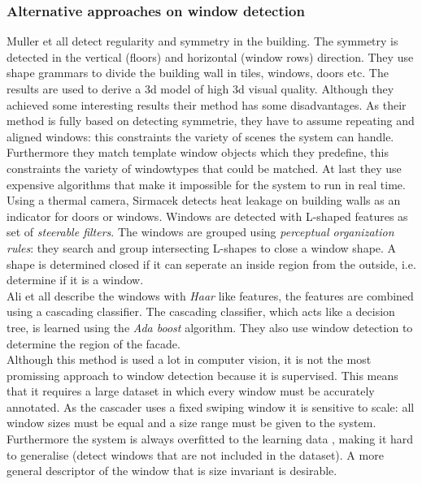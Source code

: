 \subsubsection{Alternative approaches on window detection}
Muller et all \cite{Muller_procedural} detect regularity and symmetry in the building. The
symmetry is detected in the vertical (floors) and horizontal (window
rows) direction.
They use shape grammars to divide the building wall in tiles, windows, doors etc.
The results are used to derive a 3d model of high 3d visual quality.
Although they achieved some interesting results their method has some
disadvantages.  As their method is fully based on detecting symmetrie, they have
to assume repeating and aligned windows: this constraints the variety of scenes
the system can handle.
Furthermore they match template window objects which they predefine, this 
constraints the variety of windowtypes that could be matched.  At last 
they use expensive algorithms that make it impossible for the system
to run in real time.  \\

Using a thermal camera, Sirmacek \cite{Sirmacek_thermal}
detects heat leakage on building walls as an indicator for doors or windows.
Windows are detected with L-shaped features as set of \emph{steerable filters}.
The windows are grouped using \emph{perceptual organization rules}:
they search and group intersecting L-shapes to close a window shape. A shape is
determined closed if it can seperate an inside region from the outside, i.e.
determine if it is a window.  \\

Ali et all \cite{Ali_facades} describe the windows with \emph{Haar} like
features, the features are combined using a cascading classifier. The cascading
classifier, which acts like a decision tree, is learned using the \emph{Ada
boost} algorithm.  They also use window detection to determine the region of
the facade.\\

Although this method is used a lot in computer vision, it is not the most
promissing approach to window detection because it is supervised.  This means
that it requires a large dataset in which every window must be accurately
annotated.  As the cascader uses a fixed swiping window it is sensitive to
scale: all window sizes must be equal and a size range must be given to the system.
Furthermore the system is always overfitted to the learning data
, making it hard to generalise (detect windows that are
not included in the dataset).  A more general descriptor of the window that is
size invariant is desirable.\\

